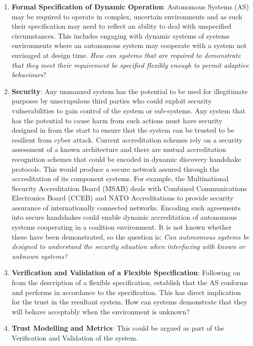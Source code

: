 \begin{enumerate}
  \item \textbf{Formal Specification of Dynamic Operation}: Autonomous Systems (AS) may be required to operate in complex, uncertain environments and as such their specification may need to reflect an ability to deal with unspecified circumstances.
    This includes engaging with dynamic systems of systems environments where an autonomous system may cooperate with a system not envisaged at design time.
    \textit{How can systems that are required to demonstrate that they meet their requirement be specified flexibly enough to permit adaptive behaviours}?
  \item \textbf{Security}: Any unmanned system has the potential to be used for illegitimate purposes by unscrupulous third parties who could exploit security vulnerabilities to gain control of the system or sub-systems.
    Any system that has the potential to cause harm from such actions must have security designed in from the start to ensure that the system can be trusted to be resilient from cyber attack.
    Current accreditation schemes rely on a security assessment of a known architecture and there are mutual accreditation recognition schemes that could be encoded in dynamic discovery handshake protocols.
    This would produce a secure network assured through the accreditation of its component systems.
    For example, the Multinational Security Accreditation Board (MSAB) deals with Combined Communications Electronics Board (CCEB) and NATO Accreditations to provide security assurance of internationally connected networks.
    Encoding such agreements into secure handshakes could enable dynamic accreditation of autonomous systems cooperating in a coalition environment.
    It is not known whether these have been demonstrated, so the question is: \textit{Can autonomous systems be designed to understand the security situation when interfacing with known or unknown systems?}
  \item \textbf{Verification and Validation of a Flexible Specification}: Following on from the description of a flexible specification, establish that the AS conforms and performs in accordance to the specification.
    This has direct implication for the trust in the resultant system.
    How can systems demonstrate that they will behave acceptably when the environment is unknown?
  \item \textbf{Trust Modelling and Metrics}: This could be argued as part of the Verification and Validation of the system.

\end{enumerate}
